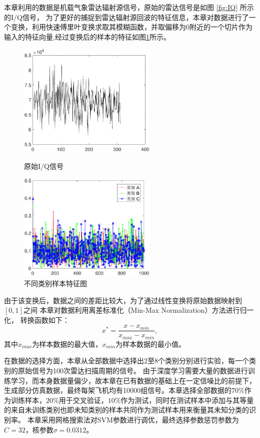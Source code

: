 本章利用的数据是机载气象雷达辐射源信号，原始的雷达信号是如图 \ref{fig:IQ} 所示的I/Q信号，
为了更好的捕捉到雷达辐射源回波的特征信息，本章对数据进行了一个变换，利用快速傅里叶变换求取其模糊函数，并取偏移为0附近的一个切片作为输入的特征向量,经过变换后的样本的特征如图\ref{fig:diff_data}所示。
\begin{figure}[hbt]
	\centering
	\begin{minipage}{7cm}
		\centering
		\includegraphics[width=6.67cm]{figures/emitter/IQA}
		\caption{原始I/Q信号}
		\label{fig:IQ}
	\end{minipage}
	\hspace{10pt}
	\begin{minipage}{7cm}
		\centering
		\includegraphics[width=6.67cm]{figures/emitter/diff_data}
		\caption{不同类别样本特征图}
		\label{fig:diff_data}
	\end{minipage}
\end{figure}
由于该变换后，数据之间的差距比较大，为了通过线性变换将原始数据映射到$[0 , 1]$之间
本章对数据利用离差标准化（Min-Max Normalization）方法进行归一化，
转换函数如下：
\begin{equation}
x^{*}=\frac{x-x_{min}}{x_{max}-x_{min}},
\end{equation}
其中$x_{max}$为样本数据的最大值，$x_{min}$为样本数据的最小值。

在数据的选择方面，本章从全部数据中选择出2至8个类别分别进行实验，每一个类别的原始信号为100次雷达扫描周期的信号。
由于深度学习需要大量的数据进行训练学习，而本身数据量偏少，故本章在已有数据的基础上在一定信噪比的前提下，生成部分仿真数据，最终每架飞机均有10000组信号。本章选择全部数据的$70\%$作为训练样本，$20\%$用于交叉验证，$10\%$作为测试，同时在测试样本中添加与其等量的来自未训练类别也即未知类别的样本共同作为测试样本用来衡量其未知分类的识别率。
本章采用网格搜索法对SVM参数进行调优，最终选择参数惩罚参数为$C=32$，核参数$\sigma=0.0312$。

